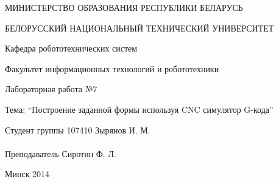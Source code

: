 \begin{titlepage} %

\thispagestyle{empty} %

\begin{center}
МИНИСТЕРСТВО ОБРАЗОВАНИЯ РЕСПУБЛИКИ БЕЛАРУСЬ

БЕЛОРУССКИЙ НАЦИОНАЛЬНЫЙ ТЕХНИЧЕСКИЙ УНИВЕРСИТЕТ

Кафедра робототехнических систем

Факультет информационных технологий и робототехники
\end{center}

\vfill

\begin{center}
Лабораторная работа №7

Тема: ``Построение заданной формы используя CNC симулятор G-кода''
\end{center}

\vfill

\noindent
Студент группы 107410 \hfill Зырянов И. М.
\\
\\
\noindent
Преподаватель \hfill Сиротин Ф. Л.

\vfill

\centerline{Минск 2014}

\clearpage %

\end{titlepage}

\setcounter{page}{2}
